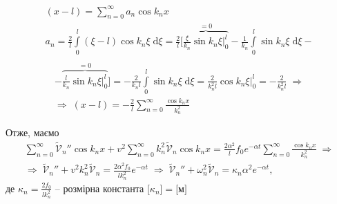 \begin{equation*}
    \begin{gathered}
        (x-l) = \sum_{n=0}^\infty a_n \cos k_n x\\
        a_n = \frac{2}{l} \int\limits_0^l (\xi-l) \cos k_n \xi \;\mathrm{d}\xi =\frac{2}{l} \bigg[\overbrace{\frac{\xi}{k_n}\sin k_n\xi \bigg|_0^l}^{=0} - \frac{1}{k_n} \int\limits_0^l \sin k_n\xi \;\mathrm{d}\xi -\\
    \end{gathered}
\end{equation*}
\begin{equation} \label{fourier-sum}
    \begin{gathered}
        -\overbrace{\frac{l}{k_n}\sin k_n\xi \bigg|_0^l}^{=0}\bigg] = -\frac{2}{k_n l} \int\limits_0^l \sin k_n\xi \;\mathrm{d}\xi = \frac{2}{k_n^2 l} \cos k_n\xi \bigg|_0^l = -\frac{2}{k_n^2 l} 
        \;\Rightarrow \\
        \Rightarrow\; (x-l) = -\frac{2}{l}\sum_{n=0}^\infty \frac{\cos k_n x}{k_n^2}
    \end{gathered}
\end{equation}

Отже, маємо 
\begin{equation}
    \begin{gathered}
        \sum_{n=0}^\infty \widetilde{\mathcal{V}}_n'' \cos k_n x + v^2 \sum_{n=0}^\infty k_n^2 \widetilde{\mathcal{V}}_n \cos k_n x =  \frac{2 \alpha^2}{l} f_0 e^{-\alpha t} \sum_{n=0}^\infty \frac{\cos k_n x}{k_n^2} 
        \;\Rightarrow\\
        \Rightarrow\; 
        \widetilde{\mathcal{V}}_n'' + v^2 k_n^2 \widetilde{\mathcal{V}}_n = \frac{2\alpha^2f_0}{l k_n^2} e^{-\alpha t} 
        \;\Rightarrow\;
        \widetilde{\mathcal{V}}_n'' + \omega_n^2 \widetilde{\mathcal{V}}_n = \kappa_n\alpha^2 e^{-\alpha t}, 
    \end{gathered}
\end{equation}
де $\kappa_n = \frac{2f_0}{l k_n^2}$ -- розмірна константа $\big[\kappa_n\big] = \big[\text{м}\big]$

